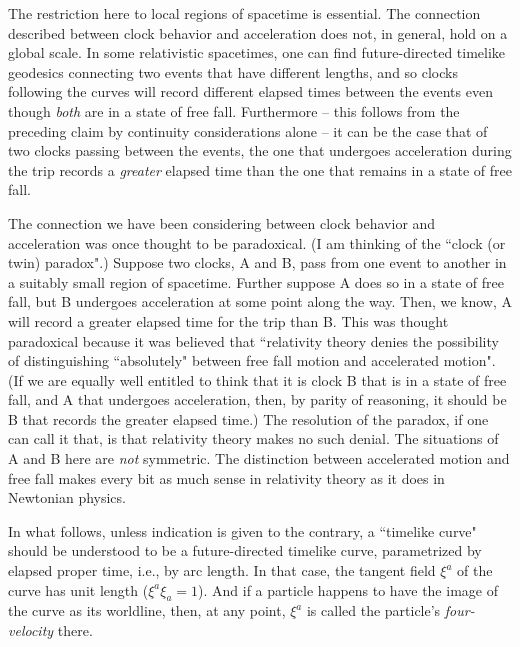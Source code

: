 \documentclass [12] {article}
\theoremstyle{plain}
\numberwithin{figure}{subsection}
\numberwithin{proposition}{subsection}
\begin{document}
The restriction here to local regions of spacetime is essential. The connection described between clock behavior and acceleration does not, in general, hold on a global scale.  In some relativistic spacetimes, one can find future-directed  timelike geodesics connecting two events that have different  lengths, and so clocks following the curves will record different elapsed times between the events even though \emph{both} are in a state of free fall. %
Furthermore -- this follows from the preceding claim by continuity considerations alone -- it can be the case that of two clocks passing between the events, the one that undergoes acceleration during the trip records a \emph{greater} elapsed time than the one that remains in a state of free fall.

The connection we have been considering between clock behavior and acceleration was once thought to be paradoxical.  (I am thinking of the ``clock (or twin) paradox".)  Suppose two clocks, A and B, pass from one event to another in a suitably small region of spacetime. Further suppose A does so in a state of free fall, but B undergoes acceleration at some point along the way. Then, we know, A will record a greater elapsed time for the trip than B.  This was thought paradoxical because it was believed that ``relativity theory denies the possibility of distinguishing ``absolutely" between free fall motion and accelerated motion".  (If we are equally well entitled to think that it is clock  B that is in a state of free fall, and A  that undergoes acceleration, then, by parity of reasoning, it should be B that records the greater elapsed time.) The resolution of the paradox, if one can call it that, is that relativity theory makes no such denial. The situations of A and B here are \emph{not} symmetric. The distinction between accelerated motion and free fall makes every bit as much sense in relativity theory as it does in Newtonian physics. 
   

In what follows, unless indication is given  to the  contrary,  a ``timelike curve" should be understood to be a future-directed timelike curve, parametrized by elapsed proper time, i.e., by arc length.  In that case, the tangent field $\xi^a$ of the curve has unit length ($\xi^a \xi_a = 1$).  And if a particle happens to have the image of the curve as its worldline, then, at any point, $\xi^a$ is called the  particle's \emph{four-velocity}  there.   
\end{document}
